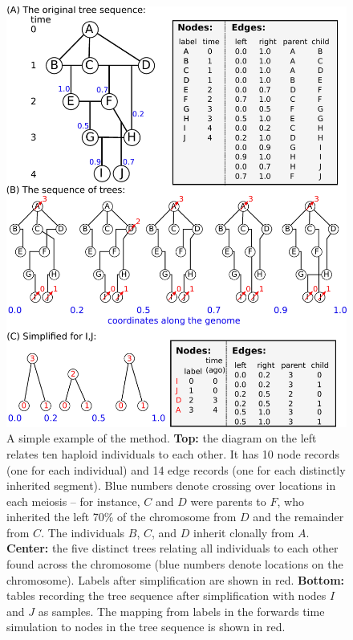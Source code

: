 \documentclass{article}
\begin{document}
\begin{figure}
    \begin{center}
        \includegraphics{method_diagram}
    \end{center}
    \caption{
        A simple example of the method.
        \textbf{Top:} the diagram on the left relates ten haploid individuals to each other.
        It has 10 node records (one for each individual)
        and 14 edge records (one for each distinctly inherited segment).
        Blue numbers denote crossing over locations in each meiosis --
        for instance, $C$ and $D$ were parents to $F$,
        who inherited the left 70\% of the chromosome from $D$ and the remainder from $C$.
        The individuals $B$, $C$, and $D$ inherit clonally from $A$.
        \textbf{Center:} the five distinct trees relating all individuals to each other
        found across the chromosome (blue numbers denote locations on the chromosome).
        Labels after simplification are shown in red.
        \textbf{Bottom:} tables recording the tree sequence after simplification
        with nodes $I$ and $J$ as samples.
        The mapping from labels in the forwards time simulation to nodes in the tree sequence
        is shown in red.
        \label{fig:method_diagram}
    }
\end{figure}
\end{document}
